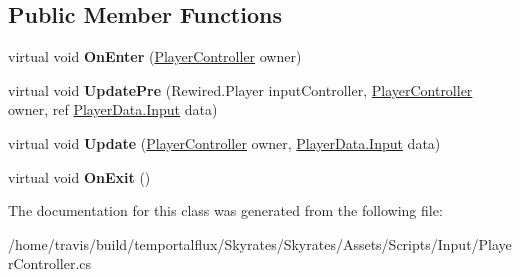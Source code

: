 \subsection*{Public Member Functions}
\begin{DoxyCompactItemize}
\item 
\hypertarget{class_skyrates_1_1_client_1_1_input_1_1_player_controller_1_1_player_state_aa7b19fa83bcf0e0b2b2837857b2e59ed}{virtual void {\bfseries On\-Enter} (\hyperlink{class_skyrates_1_1_client_1_1_input_1_1_player_controller}{Player\-Controller} owner)}\label{class_skyrates_1_1_client_1_1_input_1_1_player_controller_1_1_player_state_aa7b19fa83bcf0e0b2b2837857b2e59ed}

\item 
\hypertarget{class_skyrates_1_1_client_1_1_input_1_1_player_controller_1_1_player_state_aeb71370dc07c2e94bea677d3048cf1c5}{virtual void {\bfseries Update\-Pre} (Rewired.\-Player input\-Controller, \hyperlink{class_skyrates_1_1_client_1_1_input_1_1_player_controller}{Player\-Controller} owner, ref \hyperlink{struct_skyrates_1_1_data_1_1_player_data_1_1_input}{Player\-Data.\-Input} data)}\label{class_skyrates_1_1_client_1_1_input_1_1_player_controller_1_1_player_state_aeb71370dc07c2e94bea677d3048cf1c5}

\item 
\hypertarget{class_skyrates_1_1_client_1_1_input_1_1_player_controller_1_1_player_state_a6f04fada3b729aea4daca70a5d7051bb}{virtual void {\bfseries Update} (\hyperlink{class_skyrates_1_1_client_1_1_input_1_1_player_controller}{Player\-Controller} owner, \hyperlink{struct_skyrates_1_1_data_1_1_player_data_1_1_input}{Player\-Data.\-Input} data)}\label{class_skyrates_1_1_client_1_1_input_1_1_player_controller_1_1_player_state_a6f04fada3b729aea4daca70a5d7051bb}

\item 
\hypertarget{class_skyrates_1_1_client_1_1_input_1_1_player_controller_1_1_player_state_a6d87f75b8591e87b2fa0226b781daec2}{virtual void {\bfseries On\-Exit} ()}\label{class_skyrates_1_1_client_1_1_input_1_1_player_controller_1_1_player_state_a6d87f75b8591e87b2fa0226b781daec2}

\end{DoxyCompactItemize}


The documentation for this class was generated from the following file\-:\begin{DoxyCompactItemize}
\item 
/home/travis/build/temportalflux/\-Skyrates/\-Skyrates/\-Assets/\-Scripts/\-Input/Player\-Controller.\-cs\end{DoxyCompactItemize}
